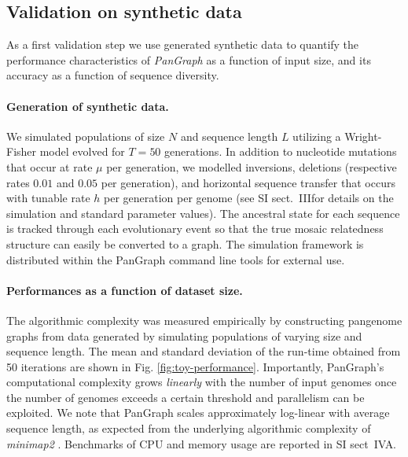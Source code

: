 \documentclass[aps,rmp,preprint,superscriptaddress,10pt,linenumbers]{revtex4-1}
\newcommand{\SIsynthdata}{III}
\newcommand{\SIsimBench}{IV}
\begin{document}
\subsection{Validation on synthetic data}

As a first validation step we use generated synthetic data to quantify the performance characteristics of \textit{PanGraph} as a function of input size, and its accuracy as a function of sequence diversity.

\paragraph*{Generation of synthetic data.}

We simulated populations of size $N$ and sequence length $L$ utilizing a Wright-Fisher model \cite{hudson2002generating} evolved for $T=50$ generations.
In addition to nucleotide mutations that occur at rate $\mu$ per generation, we modelled inversions, deletions (respective rates $0.01$ and $0.05$ per generation), and horizontal sequence transfer that occurs with tunable rate $h$ per generation per genome (see SI sect.~\SIsynthdata for details on the simulation and standard parameter values).
The ancestral state for each sequence is tracked through each evolutionary event so that the true mosaic relatedness structure can easily be converted to a graph.
The simulation framework is distributed within the PanGraph command line tools for external use.

\paragraph*{Performances as a function of dataset size.}
The algorithmic complexity was measured empirically by constructing pangenome graphs from data generated by simulating populations of varying size and sequence length.
The mean and standard deviation of the run-time obtained from 50 iterations are shown in Fig. \ref{fig:toy-performance}.
Importantly, PanGraph's computational complexity grows \emph{linearly} with the number of input genomes once the number of genomes exceeds a certain threshold and parallelism can be exploited.
We note that PanGraph scales approximately log-linear with average sequence length, as expected from the underlying algorithmic complexity of \textit{minimap2} \cite{li2018minimap2}.
Benchmarks of CPU and memory usage are reported in SI sect~{\SIsimBench}A.
\end{document}
